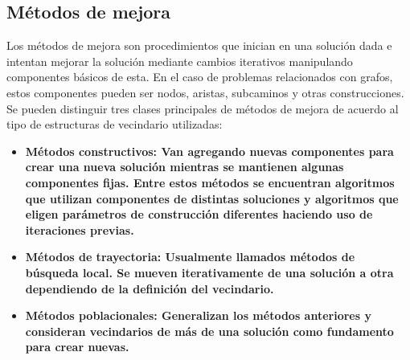 \subsection*{Métodos de mejora}
Los métodos de mejora son procedimientos que inician en una solución dada e intentan mejorar la solución mediante cambios iterativos manipulando componentes básicos de esta. En el caso de problemas relacionados con grafos, estos  componentes pueden ser nodos, aristas, subcaminos y otras construcciones. Se pueden distinguir tres clases principales de métodos de mejora de acuerdo al tipo de estructuras de vecindario utilizadas:
\begin{itemize}
	\item \bfseries Métodos constructivos\normalfont: Van agregando nuevas componentes para crear una nueva solución mientras se mantienen algunas componentes fijas. Entre estos métodos se encuentran algoritmos que utilizan componentes de distintas soluciones y algoritmos que eligen parámetros de construcción diferentes haciendo uso de iteraciones previas.
	\item \bfseries Métodos de trayectoria\normalfont: Usualmente llamados métodos de búsqueda local. Se mueven iterativamente de una solución a otra dependiendo de la definición del vecindario.
	\item \bfseries Métodos poblacionales\normalfont: Generalizan los métodos anteriores y consideran vecindarios de más de una solución como fundamento para crear nuevas.
\end{itemize}
